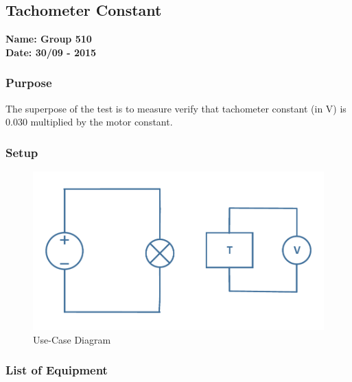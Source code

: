 \pagebreak
\subsection{Tachometer Constant} %
\textbf{Name: Group 510}\\
\textbf{Date: 30/09 - 2015}

\subsubsection{Purpose}
The superpose of the test is to measure verify that tachometer constant (in V) is 0.030 multiplied by the motor constant.

\subsubsection{Setup}
\begin{figure}[H]
  \centering
	\includegraphics[scale=0.5]{figures/MotorTest3.pdf}
	\caption{Use-Case Diagram}
	\flushleft
\end{figure}

\subsubsection{List of Equipment}

